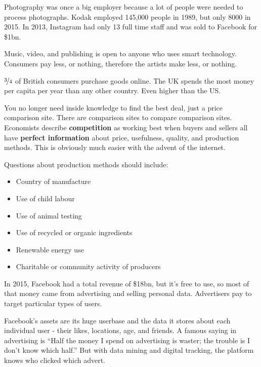 \documentclass[../main.tex]{subfile}
\begin{document}


Photography was once a big employer because a lot of people were needed to process photographs. Kodak employed 145,000 people in 1989, but only 8000 in 2015. In 2013, Instagram had only 13 full time staff and was sold to Facebook for \$1bn.

Music, video, and publishing is open to anyone who uses smart technology. Consumers pay less, or nothing, therefore the artists make less, or nothing.

$\nicefrac{3}{4}$ of British consumers purchase goods online. The UK spends the most money per capita per year than any other country. Even higher than the US.

You no longer need inside knowledge to find the best deal, just a price comparison site. There are comparison sites to compare comparison sites. Economists describe \textbf{competition} as working best when buyers and sellers all have \textbf{perfect information} about price, usefulness, quality, and production methods. This is obviously much easier with the advent of the internet.

Questions about production methods should include: \begin{itemize}
	\item Country of manufacture
	\item Use of child labour
	\item Use of animal testing
	\item Use of recycled or organic ingredients
	\item Renewable energy use
	\item Charitable or community activity of producers
\end{itemize}


In 2015, Facebook had a total revenue of \$18bn, but it's free to use, so most of that money came from advertising and selling personal data. Advertisers pay to target particular types of users.

Facebook's assets are its huge userbase and the data it stores about each individual user - their likes, locations, age, and friends. A famous saying in advertising is \enquote{Half the money I spend on advertising is waster; the trouble is I don't know which half.} But with data mining and digital tracking, the platform knows who clicked which advert.
\end{document}
